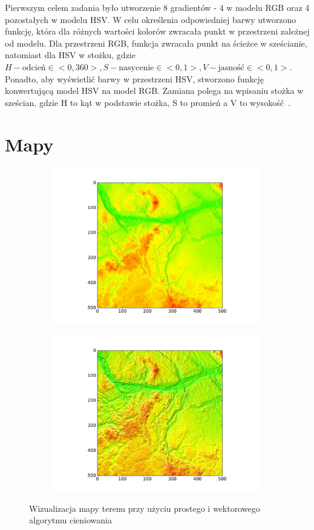 \documentclass{article}
\begin{document}
Pierwszym celem zadania było utworzenie 8 gradientów - 4 w modelu RGB oraz 4 pozostałych w modelu HSV. W celu określenia odpowiedniej barwy utworzono funkcję, która dla różnych wartości kolorów zwracała punkt w przestrzeni zależnej od modelu. Dla przestrzeni RGB, funkcja zwracała punkt na ścieżce w sześcianie, natomiast dla HSV w stożku, gdzie \mbox{\(H - \text{odcień}  \in <0,360>, S - \text{nasycenie} \in <0,1>, V - \text{jasność} \in <0,1> \)}. Ponadto, aby wyświetlić barwy w przestrzeni HSV, stworzono funkcję konwertującą model HSV na model RGB. Zamiana polega na wpisaniu stożka w sześcian, gdzie H to kąt w podstawie stożka, S to promień a V to wysokość~\cite{wiki}.  
\newpage
\section{Mapy}
\begin{figure}
	\begin{subfigure}{0.5\textwidth}
			\includegraphics[width=\textwidth]{simpleMap.pdf}
	\end{subfigure}
	\begin{subfigure}{0.5\textwidth}
			\includegraphics[width=\textwidth]{vectorMap.pdf}	
	\end{subfigure}		
\caption{Wizualizacja mapy terenu przy użyciu prostego i wektorowego algorytmu cieniowania}
\label{fig:mapy}
\end{figure}
\end{document}
